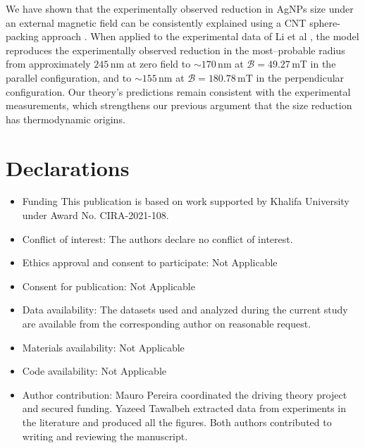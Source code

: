 \documentclass[pdflatex,sn-mathphys-num]{sn-jnl}%
\theoremstyle{thmstyleone}%
\theoremstyle{thmstyletwo}%
\theoremstyle{thmstylethree}%
\begin{document}
{{We have shown that the experimentally observed reduction in AgNPs size under an external magnetic field can be consistently explained using a CNT sphere-packing approach \cite{Tawalbeh2025controlling}. When applied to the experimental data of Li et al \cite{li2025effects}, the model reproduces the experimentally observed reduction in the most–probable radius from approximately $245\,\mathrm{nm}$ at zero field to $\sim170\,\mathrm{nm}$ at $\mathcal{B}=49.27\,\mathrm{mT}$ in the parallel configuration, and to $\sim155\,\mathrm{nm}$ at $\mathcal{B}=180.78\,\mathrm{mT}$ in the perpendicular configuration. Our theory's predictions remain consistent with the experimental measurements, which strengthens our previous argument that the size reduction has thermodynamic origins. 

\backmatter


\section*{Declarations}

\begin{itemize}
\item Funding
This publication is based on work supported by Khalifa University under Award No. CIRA-2021-108.
\item Conflict of interest: The authors declare no conflict of interest.
\item Ethics approval and consent to participate: Not Applicable
\item Consent for publication: Not Applicable
\item Data availability: The datasets used and analyzed during the current
study are available from the corresponding author on reasonable
request. 
\item Materials availability: Not Applicable
\item Code availability: Not Applicable 
\item Author contribution: Mauro Pereira coordinated the driving theory project and secured funding.
Yazeed Tawalbeh extracted data from experiments in the literature and produced all the figures. Both authors contributed to
writing and reviewing the manuscript.
 \end{itemize}
 

}}
\end{document}
